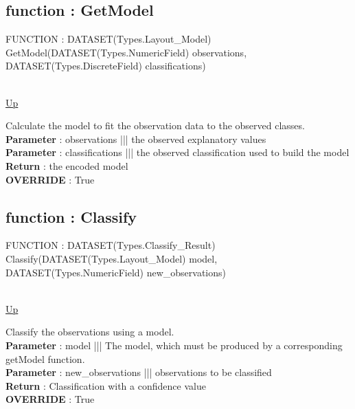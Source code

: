 \subsection*{function : GetModel}
\hypertarget{ecldoc:logisticregression.binomiallogisticregression.getmodel}{FUNCTION : DATASET(Types.Layout\_Model) GetModel(DATASET(Types.NumericField) observations, DATASET(Types.DiscreteField) classifications)} \\
\hyperlink{ecldoc:logisticregression.binomiallogisticregression}{Up} \\
\par
Calculate the model to fit the observation data to the observed classes. \\
\textbf{Parameter} : observations ||| the observed explanatory values \\
\textbf{Parameter} : classifications ||| the observed classification used to build the model \\
\textbf{Return} : the encoded model \\
\textbf{OVERRIDE} : True \\
\subsection*{function : Classify}
\hypertarget{ecldoc:logisticregression.binomiallogisticregression.classify}{FUNCTION : DATASET(Types.Classify\_Result) Classify(DATASET(Types.Layout\_Model) model, DATASET(Types.NumericField) new\_observations)} \\
\hyperlink{ecldoc:logisticregression.binomiallogisticregression}{Up} \\
\par
Classify the observations using a model. \\
\textbf{Parameter} : model ||| The model, which must be produced by a corresponding getModel function. \\
\textbf{Parameter} : new\_observations ||| observations to be classified \\
\textbf{Return} : Classification with a confidence value \\
\textbf{OVERRIDE} : True \\
